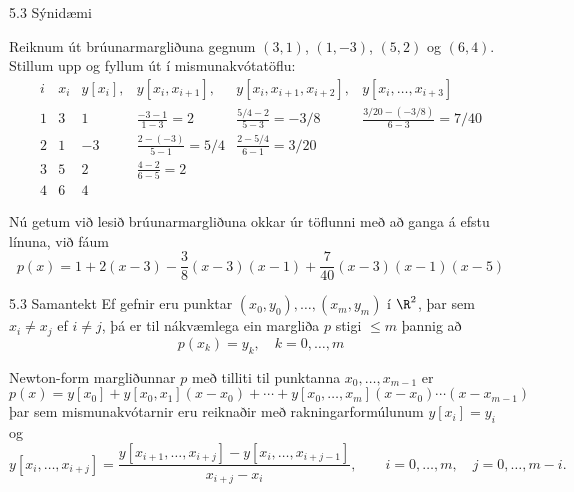 \begin{frame}{5.3 Sýnidæmi}
 
Reiknum út brúunarmargliðuna gegnum $(3,1)$, $(1,-3)$, $(5,2)$ og
$(6,4)$. Stillum upp og fyllum út í mismunakvótatöflu: 
\begin{equation*}
  \begin{array}{cc||cccc}
    i & x_i & y[x_i], & y[x_i,x_{i+1}], &
    y[x_i,x_{i+1},x_{i+2}], & y[x_i,\ldots,x_{i+3}] \\
    \hline
    1 & 3 & 1 & \frac{-3-1}{1-3} = 2 & \frac{5/4-2}{5-3} = -3/8 &
    \frac{3/20-(-3/8)}{6-3} = 7/40 \\
    2 & 1 & -3 & \frac{2-(-3)}{5-1} = 5/4 &
    \frac{2-5/4}{6-1} = 3/20 & \\
    3 & 5 & 2 & \frac{4-2}{6-5} = 2 & & \\
    4 & 6 & 4 & & &
  \end{array}
\end{equation*}

\pause
Nú getum við lesið brúunarmargliðuna okkar úr töflunni með að ganga á
efstu línuna, við fáum 
\begin{equation*}
  p(x) = 1 + 2(x-3) - \frac 38 (x-3)(x-1)
  + \frac 7{40} (x-3)(x-1)(x-5)
\end{equation*}
\end{frame}

\begin{frame}{5.3 Samantekt} 
Ef gefnir eru punktar $(x_0,y_0), \ldots, (x_m,y_m)$ í $\R^2$,
þar sem $x_i\neq x_j$ ef $i\neq j$, þá er til nákvæmlega ein 
margliða $p$ stigi $\leq m$ þannig að
$$
  p(x_k) = y_k, \quad k = 0, \ldots, m
$$

\pause
Newton-form margliðunnar $p$ með tilliti til punktanna
$x_0,\dots,x_{m-1}$ er
$$
p(x)=y[x_0]+y[x_0,x_1](x-x_0)+\cdots+y[x_0,\dots,x_m](x-x_0)\cdots(x-x_{m-1})
$$
þar sem mismunakvótarnir eru reiknaðir með rakningarformúlunum
$y[x_i]=y_i$ og
$$
  y[x_i,\ldots,x_{i+j}]
  = \frac{y[x_{i+1},\ldots,x_{i+j}] - y[x_i,\ldots,x_{i+j-1}]}
  {x_{i+j} - x_i}, \qquad i=0,\dots,m, \quad j=0,\dots,m-i.
$$
\end{frame}

